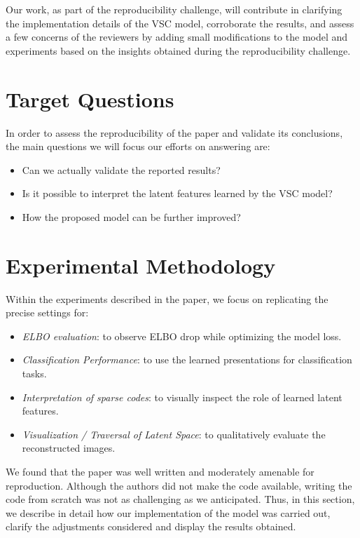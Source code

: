 Our work, as part of the reproducibility challenge, will contribute in clarifying the implementation details of the VSC model, corroborate the results, and assess a few concerns of the reviewers by adding small modifications to the model and experiments based on the insights obtained during the reproducibility challenge.

\section{Target Questions}

In order to assess the reproducibility of the paper and validate its conclusions, the main questions we will focus our efforts on answering are:
\begin{itemize}
  \item Can we actually validate the reported results? 
  \item Is it possible to interpret the latent features learned by the VSC model?
  \item How the proposed model can be further improved? 
\end{itemize}
 
\section{Experimental Methodology}
\label{experiments}

Within the experiments described in the paper, we focus on replicating the precise settings for:
\begin{itemize}
    \item \textit{ELBO evaluation}: to observe ELBO drop while optimizing the model loss.
    \item \textit{Classification Performance}: to use the learned presentations for classification tasks.
    \item \textit{Interpretation of sparse codes}: to visually inspect the role of learned latent features.
    \item \textit{Visualization / Traversal of Latent Space}: to qualitatively evaluate the reconstructed images. 
\end{itemize}

We found that the paper was well written and moderately amenable for reproduction. Although the authors did not make the code available, writing the code from scratch was not as challenging as we anticipated. Thus, in this section, we describe in detail how our implementation of the model was carried out, clarify the adjustments considered and display the results obtained.

